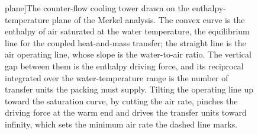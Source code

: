 \begin{figure}[htbp]
plane]{The counter-flow cooling tower drawn on the enthalpy-temperature plane
of the Merkel analysis. The convex curve is the enthalpy of air saturated at
the water temperature, the equilibrium line for the coupled heat-and-mass
transfer; the straight line is the air operating line, whose slope is the
water-to-air ratio. The vertical gap between them is the enthalpy driving
force, and its reciprocal integrated over the water-temperature range is the
number of transfer units the packing must supply. Tilting the operating line
up toward the saturation curve, by cutting the air rate, pinches the driving
force at the warm end and drives the transfer units toward infinity, which
sets the minimum air rate the dashed line marks.}
\label{fig:vol04ch07:cooling-tower}
\end{figure}
